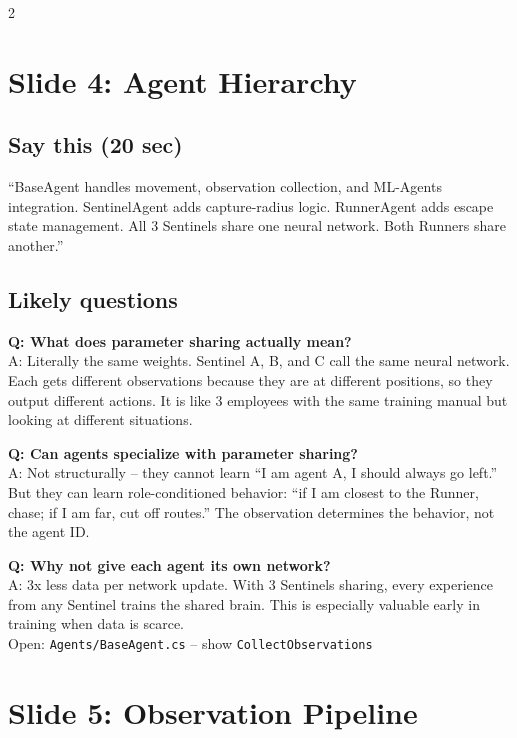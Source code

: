 \documentclass[9pt,a4paper]{article}
\begin{document}
\begin{multicols}{2}
\section{Slide 4: Agent Hierarchy}

\subsection{Say this (20 sec)}
``BaseAgent handles movement, observation collection, and ML-Agents integration. SentinelAgent adds capture-radius logic. RunnerAgent adds escape state management. All 3 Sentinels share one neural network. Both Runners share another.''

\subsection{Likely questions}
\textbf{Q: What does parameter sharing actually mean?} \\
A: Literally the same weights. Sentinel A, B, and C call the same neural network. Each gets different observations because they are at different positions, so they output different actions. It is like 3 employees with the same training manual but looking at different situations.

\textbf{Q: Can agents specialize with parameter sharing?} \\
A: Not structurally -- they cannot learn ``I am agent A, I should always go left.'' But they can learn role-conditioned behavior: ``if I am closest to the Runner, chase; if I am far, cut off routes.'' The observation determines the behavior, not the agent ID.

\textbf{Q: Why not give each agent its own network?} \\
A: 3x less data per network update. With 3 Sentinels sharing, every experience from any Sentinel trains the shared brain. This is especially valuable early in training when data is scarce. \\
{\scriptsize\color{gray} Open: \texttt{Agents/BaseAgent.cs} -- show \texttt{CollectObservations}}

\section{Slide 5: Observation Pipeline}


\end{multicols}
\end{document}
